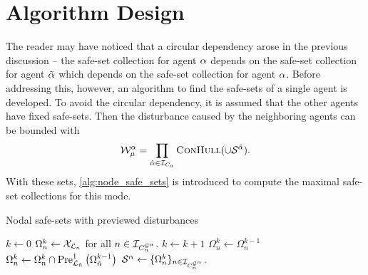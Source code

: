 \section{Algorithm Design}
The reader may have noticed that a circular dependency arose in the previous discussion -- the safe-set collection for agent $\alpha$ depends on the safe-set collection for agent ${\tilde{\alpha}}$ which depends on the safe-set collection for agent $\alpha$. Before addressing this, however, an algorithm to find the safe-sets of a single agent is developed. To avoid the circular dependency, it is assumed that the other agents have fixed safe-sets. Then the disturbance caused by the neighboring agents can be bounded with
\begin{equation}
\wcon[\agentidx][\modeidx]=\prod_{\tilde{\agentidx}\in\idxset{\numagents}}\Call{ConHull}{\cup\mathcal{S}^{\tilde{\agentidx}}}.
\end{equation}
With these sets, \autoref{alg:node_safe_sets} is introduced to compute the maximal safe-set collections for this mode. 
\begin{algorithm}[h]
\caption{Nodal safe-sets with previewed disturbances}\label{alg:node_safe_sets}
\begin{algorithmic}[1]
\State $k\gets0$
\State $\Omega_{n}^k\gets\xcon[\gnodelabel{n}]$ for all $n\in\idxset{\gnumnodes[\agentidx]}$.
\Repeat 
	\State $k\gets k+1$
		\State $\Omega_{n}^k\gets\Omega_{n}^{k-1}$
				\State $\Omega_{n}^k\gets\Omega_{n}^k\cap\PreviewedPre[\gnodelabel{\tilde{n}}][1]{\Omega_{\tilde{n}}^{k-1}}$
			\EndFor
	\EndFor
{}
\State $\safeset{}^\agentidx\gets\{\Omega_{n}^k\}_{n\in\idxset{\gnumnodes[\agentidx]}}$.\;
\EndProcedure
\end{algorithmic}
\end{algorithm}

